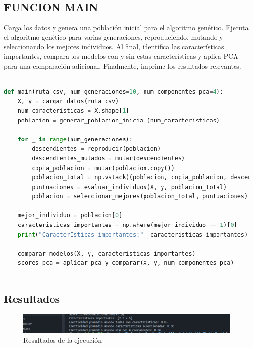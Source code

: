 \documentclass[12pt]{article}
\begin{document}
\subsection*{FUNCION MAIN}

Carga los datos y genera una población inicial para el algoritmo genético. Ejecuta el algoritmo genético para varias generaciones, reproduciendo, mutando y seleccionando los mejores individuos. Al final, identifica las características importantes, compara los modelos con y sin estas características y aplica PCA para una comparación adicional. Finalmente, imprime los resultados relevantes. \vspace{1cm}

\begin{lstlisting}[language=Python]
	
def main(ruta_csv, num_generaciones=10, num_componentes_pca=4):
	X, y = cargar_datos(ruta_csv)
	num_caracteristicas = X.shape[1]
	poblacion = generar_poblacion_inicial(num_caracteristicas)
	
	for _ in range(num_generaciones):
		descendientes = reproducir(poblacion)
		descendientes_mutados = mutar(descendientes)
		copia_poblacion = mutar(poblacion.copy())
		poblacion_total = np.vstack((poblacion, copia_poblacion, descendientes_mutados))
		puntuaciones = evaluar_individuos(X, y, poblacion_total)
		poblacion = seleccionar_mejores(poblacion_total, puntuaciones)
	
	mejor_individuo = poblacion[0]
	caracteristicas_importantes = np.where(mejor_individuo == 1)[0]
	print("CaracterIsticas importantes:", caracteristicas_importantes)
	
	comparar_modelos(X, y, caracteristicas_importantes)
	scores_pca = aplicar_pca_y_comparar(X, y, num_componentes_pca)
	
\end{lstlisting}

\subsection*{Resultados}

\begin{figure}[h]
	\centering %
	\includegraphics[width=1\textwidth]{krn} %
	\caption{Resultados de la ejecución} %
	\label{fig:imagen1} %
\end{figure}
\end{document}
